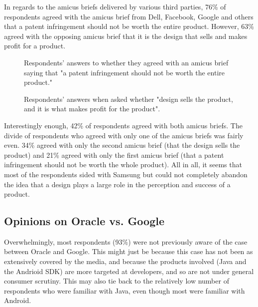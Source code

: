 \documentclass[prodmode,cs196]{acmlarge}
\begin{document}
In regards to the amicus briefs delivered by various third parties, 76\% of respondents agreed with the amicus brief from Dell, Facebook, Google and others that a patent infringement should not be worth the entire product. However, 63\% agreed with the opposing amicus brief that it is the design that sells and makes profit for a product.

\begin{figure}[h]
	\caption{Respondents' answers to whether they agreed with an amicus brief saying that "a patent infringement should not be worth the entire product."}
\end{figure}

\begin{figure}[H]
	\caption{Respondents' answers when asked whether "design sells the product, and it is what makes profit for the product".}
\end{figure}

Interestingly enough, 42\% of respondents agreed with both amicus briefs. The divide of respondents who agreed with only one of the amicus briefs was fairly even. 34\% agreed with only the second amicus brief (that the design sells the product) and  21\% agreed with only the first amicus brief (that a patent infringement should not be worth the whole product). All in all, it seems that most of the respondents sided with Samsung but could not completely abandon the idea that a design plays a large role in the perception and success of a product.

\subsection{Opinions on Oracle vs. Google}

Overwhelmingly, most respondents (93\%) were not previously aware of the case between Oracle and Google. This might just be because this case has not been as extensively covered by the media, and because the products involved (Java and the Andrioid SDK) are more targeted at developers, and so are not under general consumer scrutiny. This may also tie back to the relatively low number of respondents who were familiar with Java, even though most were familiar with Android.
\end{document}
